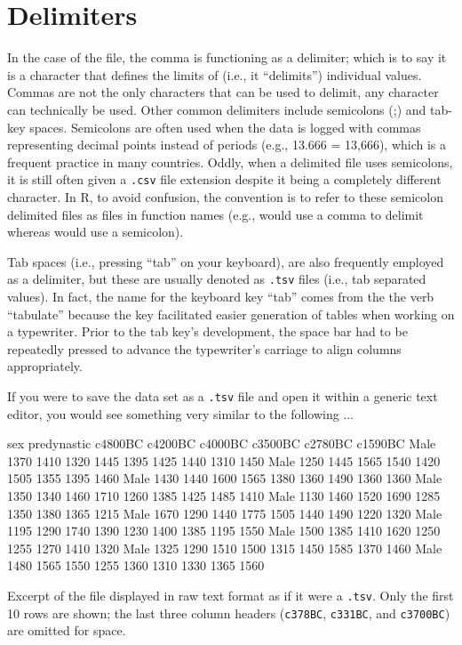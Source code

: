 \section{Delimiters}

In the case of the  file, the comma is functioning as a \gls{delimiter}; which is to say it is a character that defines the limits of (i.e., it ``delimits'') individual values. Commas are not the only characters that can be used to delimit, any character can technically be used. Other common delimiters include semicolons (;) and tab-key spaces. Semicolons are often used when the data is logged with commas representing decimal points instead of periods (e.g., 13.666 = 13,666), which is a frequent practice in many countries. Oddly, when a delimited file uses semicolons, it is still often given a \texttt{.csv} file extension despite it being a completely different character.  In R, to avoid confusion, the convention is to refer to these semicolon delimited files as  files in function names (e.g.,  would use a comma to delimit whereas  would use a semicolon).

Tab spaces (i.e., pressing ``tab'' on your keyboard), are also frequently employed as a delimiter, but these are usually denoted as \texttt{.tsv} files (i.e., tab separated values). In fact, the name for the keyboard key ``tab'' comes from the the verb ``tabulate'' because the key facilitated easier generation of tables when working on a typewriter. Prior to the tab key's development, the space bar had to be repeatedly pressed to advance the typewriter's carriage to align columns appropriately. 

If you were to save the  data set as a \texttt{.tsv} file and open it within a generic text editor, you would see something very similar to the following ...

\vspace{1em}
\begin{listing}[H]
\begin{raw}
sex	predynastic	c4800BC	c4200BC	c4000BC	c3500BC	c2780BC	c1590BC
Male	1370	1410	1320	1445	1395	1425	1440	1310	1450	
Male	1250	1445	1565	1540	1420	1505	1355	1395	1460	
Male	1430	1440	1600	1565	1380	1360	1490	1360	1360	
Male	1350	1340	1460	1710	1260	1385	1425	1485	1410	
Male	1130	1460	1520	1690	1285	1350	1380	1365	1215	
Male	1670	1290	1440	1775	1505	1440	1490	1220	1320	
Male	1195	1290	1740	1390	1230	1400	1385	1195	1550	
Male	1500	1385	1410	1620	1250	1255	1270	1410	1320	
Male	1325	1290	1510	1500	1315	1450	1585	1370	1460	
Male	1480	1565	1550	1255	1360	1310	1330	1365	1560	
\end{raw}
\caption*{Excerpt of the  file displayed in raw text format as if it were a \texttt{.tsv}. Only the first 10 rows are shown; the last three column headers (\texttt{c378BC}, \texttt{c331BC}, and \texttt{c3700BC}) are omitted for space.}
\end{listing}
\vspace{1em}

